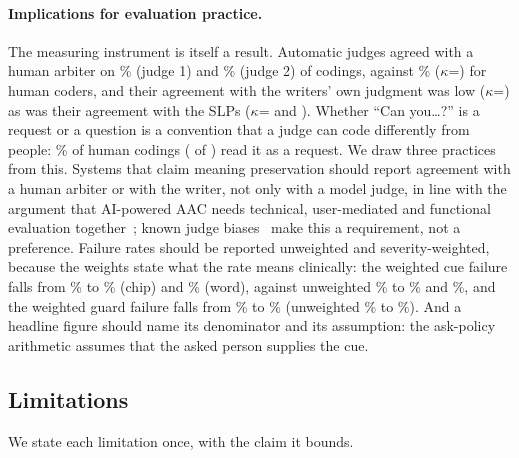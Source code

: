 \paragraph{Implications for evaluation practice.}
The measuring instrument is itself a result.
Automatic judges agreed with a human arbiter on \jmpOneNineAgreeJOne{}\% (judge 1) and \jmpOneNineAgreeJTwo{}\% (judge 2) of \jmpOneNineCodings{} codings, against \jmpOneNineAgreeArb{}\% (\ensuremath{\kappa}=\jmpOneNineKappaArb{}) for human coders, and their agreement with the writers' own judgment was low (\ensuremath{\kappa}=\jmpOneEightKappa{}) as was their agreement with the SLPs (\ensuremath{\kappa}=\jmslpJudgeKappaOne{} and \jmslpJudgeKappaTwo{}).
Whether ``Can you\ldots?'' is a request or a question is a convention that a judge can code differently from people: \jmpOneNineCanYouRequest{}\% of human codings (\jmpOneNineCanYouK{} of \jmpOneNineCanYouN{}) read it as a request.
We draw three practices from this.
Systems that claim meaning preservation should report agreement with a human arbiter or with the writer, not only with a model judge, in line with the argument that AI-powered AAC needs technical, user-mediated and functional evaluation together~\cite{frisch2026complicated}; known judge biases~\cite{zheng2023judging} make this a requirement, not a preference.
Failure rates should be reported unweighted and severity-weighted, because the weights state what the rate means clinically: the weighted cue failure falls from \jmslpWCueBare{}\% to \jmslpWCueChip{}\% (chip) and \jmslpWCueWord{}\% (word), against unweighted \jmslpUCueBare{}\% to \jmslpUCueChip{}\% and \jmslpUCueWord{}\%, and the weighted guard failure falls from \jmslpWGuardBase{}\% to \jmslpWGuardG{}\% (unweighted \jmslpUGuardBase{}\% to \jmslpUGuardG{}\%).
And a headline figure should name its denominator and its assumption: the ask-policy arithmetic assumes that the asked person supplies the cue.

\subsection{Limitations}\label{sec:limitations}

We state each limitation once, with the claim it bounds.


